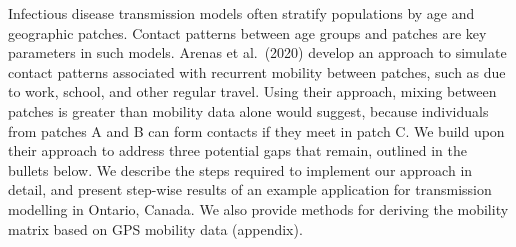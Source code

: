 Infectious disease transmission models often stratify populations by age and geographic patches.
Contact patterns between age groups and patches are key parameters in such models.
Arenas et al.\ (2020) develop an approach to simulate contact patterns associated with
recurrent mobility between patches, such as due to work, school, and other regular travel.
Using their approach, mixing between patches is greater than mobility data alone would suggest,
because individuals from patches A and B can form contacts if they meet in patch C.
We build upon their approach to address three potential gaps that remain, outlined in the bullets below.
We describe the steps required to implement our approach in detail,
and present step-wise results of an example application
for \sarscovii transmission modelling in Ontario, Canada.
We also provide methods for deriving the mobility matrix based on GPS mobility data (appendix).
